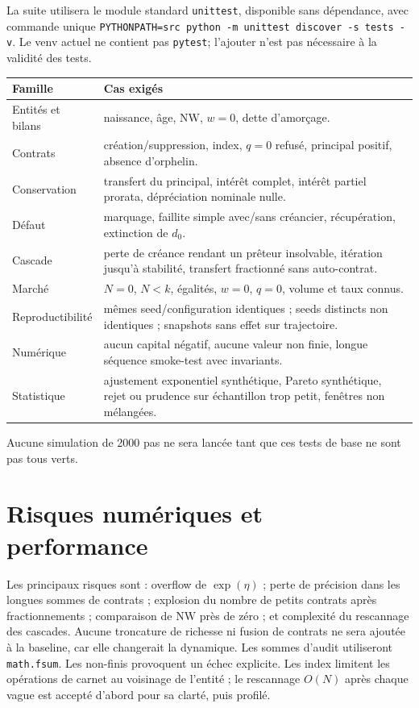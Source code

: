 \documentclass[11pt,a4paper]{article}
\newcommand{\NW}{\mathrm{NW}}
\newcommand{\code}[1]{\texttt{#1}}
\begin{document}
La suite utilisera le module standard \code{unittest}, disponible sans dépendance,
avec commande unique
\code{PYTHONPATH=src python -m unittest discover -s tests -v}. Le venv actuel ne
contient pas \code{pytest}; l'ajouter n'est pas nécessaire à la validité des tests.

\begin{longtable}{p{}p{}}
\toprule
Famille & Cas exigés \\
\midrule
\endhead
Entités et bilans & naissance, âge, $\NW$, $w=0$, dette d'amorçage. \\
Contrats & création/suppression, index, $q=0$ refusé, principal positif,
absence d'orphelin. \\
Conservation & transfert du principal, intérêt complet, intérêt partiel prorata,
dépréciation nominale nulle. \\
Défaut & marquage, faillite simple avec/sans créancier, récupération, extinction
de $d_0$. \\
Cascade & perte de créance rendant un prêteur insolvable, itération jusqu'à
stabilité, transfert fractionné sans auto-contrat. \\
Marché & $N=0$, $N<k$, égalités, $w=0$, $q=0$, volume et taux connus. \\
Reproductibilité & mêmes seed/configuration identiques ; seeds distincts non
identiques ; snapshots sans effet sur trajectoire. \\
Numérique & aucun capital négatif, aucune valeur non finie, longue séquence
smoke-test avec invariants. \\
Statistique & ajustement exponentiel synthétique, Pareto synthétique, rejet ou
prudence sur échantillon trop petit, fenêtres non mélangées. \\
\bottomrule
\end{longtable}

Aucune simulation de 2000 pas ne sera lancée tant que ces tests de base ne sont
pas tous verts.

\section{Risques numériques et performance}

Les principaux risques sont : overflow de $\exp(\eta)$ ; perte de précision dans
les longues sommes de contrats ; explosion du nombre de petits contrats après
fractionnements ; comparaison de $\NW$ près de zéro ; et complexité du rescannage
des cascades. Aucune troncature de richesse ni fusion de contrats ne sera ajoutée
à la baseline, car elle changerait la dynamique. Les sommes d'audit utiliseront
\code{math.fsum}. Les non-finis provoquent un échec explicite. Les index limitent
les opérations de carnet au voisinage de l'entité ; le rescannage $O(N)$ après
chaque vague est accepté d'abord pour sa clarté, puis profilé.
\end{document}
